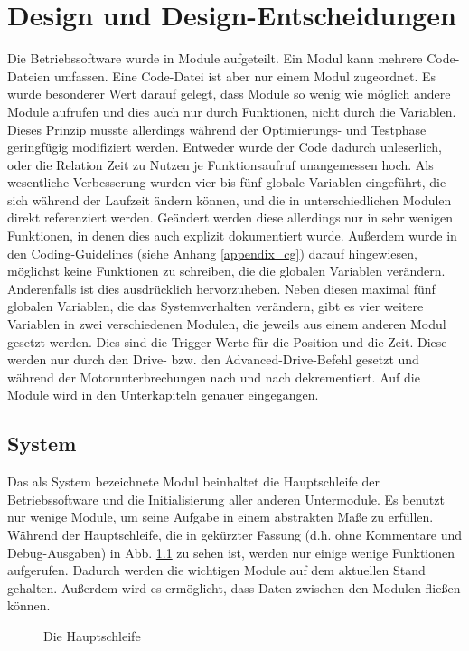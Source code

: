 \chapter{Design und Design-Entscheidungen}
Die Betriebssoftware wurde in Module aufgeteilt. Ein Modul kann mehrere Code-Dateien
umfassen. Eine Code-Datei ist aber nur einem Modul zugeordnet.
Es wurde besonderer Wert darauf gelegt, dass Module so wenig wie möglich andere
Module aufrufen und dies auch nur durch Funktionen, nicht durch die Variablen.
Dieses Prinzip musste allerdings während der Optimierungs- und Testphase
geringfügig modifiziert werden. Entweder wurde der Code dadurch unleserlich, oder
die Relation Zeit zu Nutzen je Funktionsaufruf unangemessen hoch.
Als wesentliche Verbesserung wurden vier bis fünf globale Variablen eingeführt, die
sich während der Laufzeit ändern können, und die in unterschiedlichen Modulen direkt
referenziert werden.
Geändert werden diese allerdings nur in sehr wenigen Funktionen, in denen dies
auch explizit dokumentiert wurde. Außerdem wurde in den Coding-Guidelines (siehe 
Anhang \ref{appendix_cg}) darauf hingewiesen,
möglichst keine Funktionen zu schreiben, die die globalen Variablen verändern.
Anderenfalls ist dies ausdrücklich hervorzuheben.
Neben diesen maximal fünf globalen Variablen, die das Systemverhalten verändern, gibt es vier
weitere Variablen in zwei verschiedenen Modulen, die jeweils aus einem anderen
Modul gesetzt werden. Dies sind die Trigger-Werte für die Position und
die Zeit. Diese werden nur durch den Drive- bzw. den Advanced-Drive-Befehl
gesetzt und während der Motorunterbrechungen nach und nach dekrementiert.
Auf die Module wird in den Unterkapiteln genauer eingegangen.
\section{System}
Das als System bezeichnete Modul beinhaltet die Hauptschleife der Betriebssoftware
und die Initialisierung aller anderen Untermodule. Es benutzt nur wenige Module,
um seine Aufgabe in einem abstrakten Maße zu erfüllen. Während der Hauptschleife, die
in gekürzter Fassung (d.h. ohne Kommentare und Debug-Ausgaben) in Abb. \ref{main_loop} zu sehen ist,
werden nur einige wenige Funktionen aufgerufen. Dadurch werden die wichtigen Module auf dem
aktuellen Stand gehalten. Außerdem wird es ermöglicht, dass Daten zwischen den Modulen fließen können.
\begin{figure}[htb]
 \centering
 \caption{\label{main_loop}Die Hauptschleife}
\end{figure}

